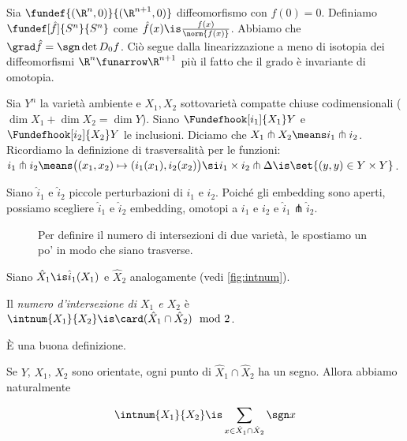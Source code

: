 
Sia $\fundef{(\R^n,0)}{(\R^{n+1},0)}$ diffeomorfismo con $f(0)=0$.
Definiamo $\fundef[\hat f]{S^n}{S^n}$ come $\hat f(x)\is\frac{f(x)}{\norm{f(x)}}$.
Abbiamo che $\grad\hat f=\sgn\det D_0f$.
Ciò segue dalla linearizzazione a meno di isotopia dei diffeomorfismi $\R^n\funarrow\R^{n+1}$ più il fatto che il grado è invariante di omotopia.


Sia $Y^n$ la varietà ambiente e $X_1,X_2$ sottovarietà compatte chiuse codimensionali ($\dim X_1+\dim X_2=\dim Y$).
Siano $\Fundefhook[i_1]{X_1}Y$ e $\Fundefhook[i_2]{X_2}Y$ le inclusioni.
Diciamo che $X_1 \pitchfork X_2\means i_1\pitchfork i_2$.
Ricordiamo la definizione di trasversalità per le funzioni: $i_1 \pitchfork i_2 \means\big((x_1,x_2)\mapsto(i_1(x_1),i_2(x_2)\big)\si i_1\times i_2\pitchfork\Delta\is\set{(y,y)\in Y\times Y}$.

Siano $\hat i_1$ e $\hat i_2$ piccole perturbazioni di $i_1$ e $i_2$.
Poiché gli embedding sono aperti, possiamo scegliere $\hat i_1$ e $\hat i_2$ embedding, omotopi a $i_1$ e $i_2$ e $\hat i_1\pitchfork\hat i_2$.
\begin{figure}
	\centering
	
	\caption{Per definire il numero di intersezioni di due varietà, le spostiamo un po' in modo che siano trasverse.}
	\label{fig:intnum}
\end{figure}
Siano $\hat X_1\is\hat i_1(X_1)$ e $\hat X_2$ analogamente (vedi \autoref{fig:intnum}).

\begin{defn}
	Il \emph{numero d'intersezione di $X_1$ e $X_2$} è $\intnum{X_1}{X_2}\is\card(\hat X_1\cap\hat X_2)\mod 2$.
\end{defn}

\begin{teo}
	È una buona definizione.
\end{teo}


Se $Y$, $X_1$, $X_2$ sono orientate, ogni punto di $\hat X_1\cap\hat X_2$ ha un segno.
Allora abbiamo naturalmente

\begin{defn}
	\[\intnum{X_1}{X_2}\is\sum_{x\in\hat X_1\cap\hat X_2}\sgn x\]
\end{defn}

